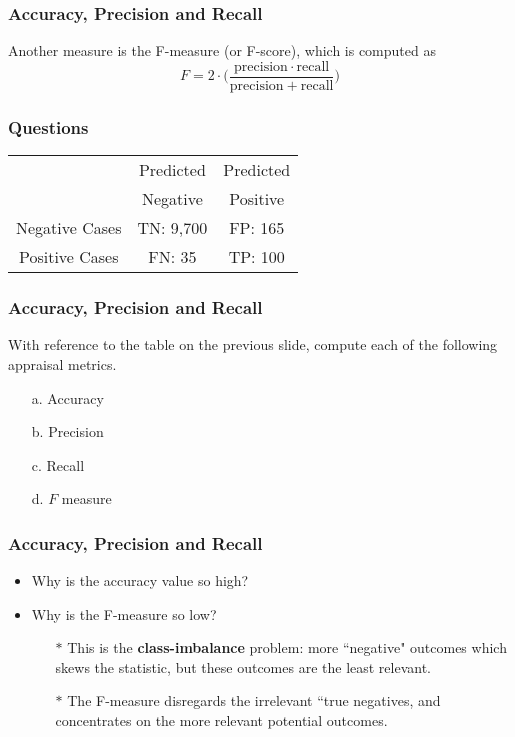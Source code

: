 \documentclass[a4]{beamer}
\begin{document}
\begin{frame}
	\frametitle{Accuracy, Precision and Recall}
	Another measure is the F-measure (or F-score), which is computed as
	\[F = 2 \cdot \bigg( \frac{\mathrm{precision} \cdot \mathrm{recall}}{ \mathrm{precision} + \mathrm{recall}} \bigg)\]
	
\end{frame}
\begin{frame}
	\frametitle{Questions}
	\large
	\begin{center}
		\begin{tabular}{|c|c|c|}
			\hline
			& Predicted  & Predicted \\
			& Negative & Positive \\ \hline
			Negative Cases & TN: 9,700  & FP: 165 \\ \hline
			Positive Cases & FN: 35 & TP: 100 \\ \hline
		\end{tabular} 
	\end{center}
\end{frame}
\begin{frame}
	\frametitle{Accuracy, Precision and Recall}
	
	With reference to the table on the previous slide, compute each of the following appraisal metrics.
	\begin{multicols}{2} 
		\begin{itemize}
			\item[a.] Accuracy
			\item[b.] Precision
			\item[c.] Recall
			\item[d.] $F$ measure
		\end{itemize}
	\end{multicols}
\end{frame}
\begin{frame}
	\frametitle{Accuracy, Precision and Recall}
	\begin{itemize}
		\item Why is the accuracy value so high?
		\item Why is the F-measure so low?
		\begin{itemize}
\item[$\ast$] This is the \textbf{class-imbalance} problem: more ``negative" outcomes which skews the statistic, but these outcomes are the least relevant.
\item[$\ast$] The F-measure disregards the irrelevant ``true negatives, and concentrates on the more relevant potential outcomes.

		\end{itemize}
		\end{itemize}
\end{frame}
\end{document}
